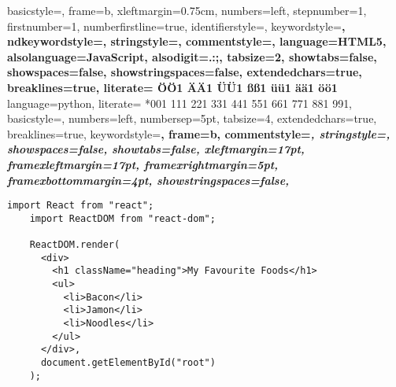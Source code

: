 \documentclass{article}
\begin{document}
 {%
  basicstyle={\footnotesize\ttfamily},   
  frame=b,
  xleftmargin={0.75cm},
  numbers=left,
  stepnumber=1,
  firstnumber=1,
  numberfirstline=true,	
  identifierstyle=\color{black},
  keywordstyle=\color{blue}\bfseries,
  ndkeywordstyle=\color{editorGreen}\bfseries,
  stringstyle=\color{myGreen}\ttfamily,
  commentstyle=\color{brown}\ttfamily,
  language=HTML5,
  alsolanguage=JavaScript,
  alsodigit={.:;},	
  tabsize=2,
  showtabs=false,
  showspaces=false,
  showstringspaces=false,
  extendedchars=true,
  breaklines=true,
  literate=%
  {Ö}{{\"O}}1
  {Ä}{{\"A}}1
  {Ü}{{\"U}}1
  {ß}{{\ss}}1
  {ü}{{\"u}}1
  {ä}{{\"a}}1
  {ö}{{\"o}}1
}
%
 {%
language=python,
literate=%
*{0}{{{\color{lightred}0}}}1
{1}{{{\color{lightred}1}}}1
{2}{{{\color{lightred}2}}}1
{3}{{{\color{lightred}3}}}1
{4}{{{\color{lightred}4}}}1
{5}{{{\color{lightred}5}}}1
{6}{{{\color{lightred}6}}}1
{7}{{{\color{lightred}7}}}1
{8}{{{\color{lightred}8}}}1
{9}{{{\color{lightred}9}}}1,
basicstyle=\footnotesize\ttfamily, %
numbers=left,               %
numbersep=5pt,              %
tabsize=4,                  %
extendedchars=true,         %
breaklines=true,            %
keywordstyle=\color{blue}\bfseries,
frame=b,
commentstyle=\color{brown}\itshape,
stringstyle=\color{editorOcher}\ttfamily, %
showspaces=false,           %
showtabs=false,             %
xleftmargin=17pt,
framexleftmargin=17pt,
framexrightmargin=5pt,
framexbottommargin=4pt,
showstringspaces=false,      %
}%
%
\makeatother

\begin{lstlisting}[style=htmlcssjs]
    import React from "react";
    import ReactDOM from "react-dom";
    
    ReactDOM.render(
      <div>
        <h1 className="heading">My Favourite Foods</h1>
        <ul>
          <li>Bacon</li>
          <li>Jamon</li>
          <li>Noodles</li>
        </ul>
      </div>,
      document.getElementById("root")
    );
\end{lstlisting}
\end{document}
